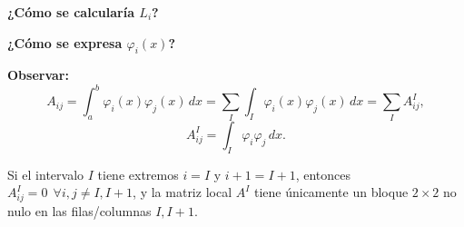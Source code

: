 \documentclass[11pt]{article}
\begin{document}
\bigskip
\noindent \textbf{¿Cómo se calcularía $L_i$?}

\noindent \textbf{¿Cómo se expresa $\varphi_i(x)$?}

\bigskip
\noindent \textbf{Observar:}
\[
A_{ij} = \int_a^b \varphi_i(x) \varphi_j(x)\, dx = \sum_I \int_I \varphi_i(x) \varphi_j(x)\, dx = \sum_I A^I_{ij},
\]
\[
A^I_{ij} = \int_I \varphi_i \varphi_j\, dx.
\]

Si el intervalo $I$ tiene extremos $i = I$ y $i+1 = I+1$, entonces $A^I_{ij} = 0\ \ \forall i, j \neq I, I+1$, y la matriz local $A^I$ tiene únicamente un bloque $2\times 2$ no nulo en las filas/columnas $I, I+1$.
\end{document}
